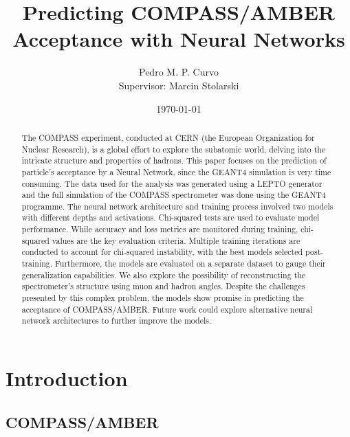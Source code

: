 \documentclass{article}
\title{Predicting COMPASS/AMBER Acceptance with Neural Networks}
\author{Pedro M. P. Curvo \\ Supervisor: Marcin Stolarski}
\date{\today}
\begin{document}
\maketitle

\begin{abstract}
    The COMPASS experiment, conducted at CERN (the European Organization for Nuclear Research),
    is a global effort to explore the subatomic world, delving into the intricate structure and properties of hadrons.
    This paper focuses on the prediction of particle's acceptance by a Neural Network, since the GEANT4 simulation
    is very time consuming. The data used for the analysis was generated using a LEPTO generator and the full
    simulation of the COMPASS spectrometer was done using the GEANT4 programme. 
    The neural network architecture and training process involved two models with different depths and activations.
    Chi-squared tests are used to evaluate model performance. While accuracy and loss metrics are monitored during
    training, chi-squared values are the key evaluation criteria. Multiple training iterations are conducted to
    account for chi-squared instability, with the best models selected post-training.
    Furthermore, the models are evaluated on a separate dataset to gauge their generalization capabilities.
    We also explore the possibility of reconstructing the spectrometer's structure using muon and hadron angles.
    Despite the challenges presented by this complex problem, the models show promise in predicting the acceptance
    of COMPASS/AMBER. Future work could explore alternative neural network architectures to further improve the
    models.

\end{abstract}

\section{Introduction}

\subsection{COMPASS/AMBER}
\end{document}
